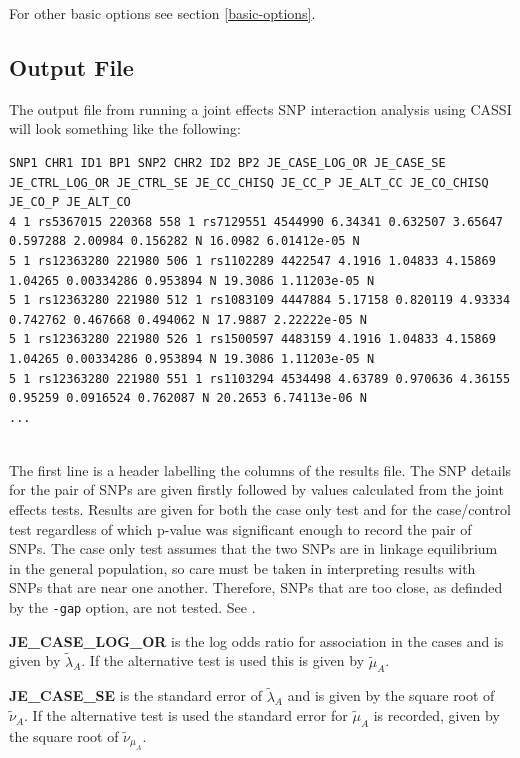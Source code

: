 \documentclass[a4paper,12pt]{article}
\newcommand{\code}[1]{{\footnotesize{{\tt #1}}}}
\begin{document}
For other basic options see  section \ref{basic-options}. 


\subsection{Output File}
\label{je-output}

The output file from running a joint effects SNP interaction analysis using CASSI will look something like the following: 
\vspace{0.35cm} \begin{lstlisting}
SNP1 CHR1 ID1 BP1 SNP2 CHR2 ID2 BP2 JE_CASE_LOG_OR JE_CASE_SE JE_CTRL_LOG_OR JE_CTRL_SE JE_CC_CHISQ JE_CC_P JE_ALT_CC JE_CO_CHISQ JE_CO_P JE_ALT_CO
4 1 rs5367015 220368 558 1 rs7129551 4544990 6.34341 0.632507 3.65647 0.597288 2.00984 0.156282 N 16.0982 6.01412e-05 N
5 1 rs12363280 221980 506 1 rs1102289 4422547 4.1916 1.04833 4.15869 1.04265 0.00334286 0.953894 N 19.3086 1.11203e-05 N
5 1 rs12363280 221980 512 1 rs1083109 4447884 5.17158 0.820119 4.93334 0.742762 0.467668 0.494062 N 17.9887 2.22222e-05 N
5 1 rs12363280 221980 526 1 rs1500597 4483159 4.1916 1.04833 4.15869 1.04265 0.00334286 0.953894 N 19.3086 1.11203e-05 N
5 1 rs12363280 221980 551 1 rs1103294 4534498 4.63789 0.970636 4.36155 0.95259 0.0916524 0.762087 N 20.2653 6.74113e-06 N
... 
 
\end{lstlisting} \vspace{0.35cm}
The first line is a header labelling the columns of the results file. The SNP details for the pair of SNPs are given firstly followed by values calculated from the joint effects tests. Results are given for both the case only test and for the case/control test regardless of which p-value was significant enough to record the pair of SNPs. The case only test assumes that the two SNPs are in linkage equilibrium in the general population, so care must be taken in interpreting results with SNPs that are near one another. Therefore, SNPs that are too close, as definded by the \code{-gap} option, are not tested. See \citet{ueki:etal:12}. 

{\bf JE\_CASE\_LOG\_OR} is the log odds ratio for association in the cases and is given by $\tilde{\lambda}_A$. If the alternative test is used this is given by $\tilde{\mu}_A$. 

{\bf JE\_CASE\_SE} is the standard error of $\tilde{\lambda}_A$ and is given by the square root of $\tilde{\nu}_A$. If the alternative test is used the standard error for $\tilde{\mu}_A$ is recorded, given by the square root of $\tilde{\nu}_{\mu_A}$. 
\end{document}
